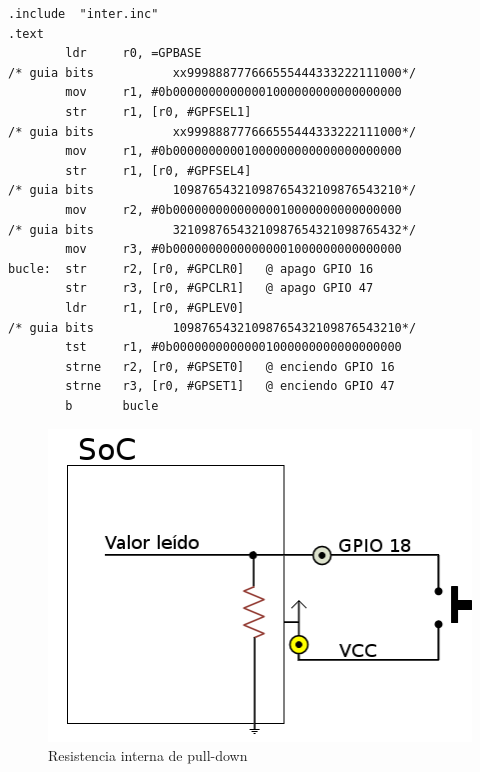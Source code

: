 \begin{lstlisting}[caption={apend3.s},label={lst:codigoApendice_3}]
        .include  "inter.inc"
.text
        ldr     r0, =GPBASE
/* guia bits           xx999888777666555444333222111000*/
        mov     r1, #0b00000000000001000000000000000000
        str     r1, [r0, #GPFSEL1]
/* guia bits           xx999888777666555444333222111000*/
        mov     r1, #0b00000000001000000000000000000000
        str     r1, [r0, #GPFSEL4]
/* guia bits           10987654321098765432109876543210*/
        mov     r2, #0b00000000000000010000000000000000
/* guia bits           32109876543210987654321098765432*/
        mov     r3, #0b00000000000000001000000000000000
bucle:  str     r2, [r0, #GPCLR0]   @ apago GPIO 16
        str     r3, [r0, #GPCLR1]   @ apago GPIO 47
        ldr     r1, [r0, #GPLEV0]
/* guia bits           10987654321098765432109876543210*/
        tst     r1, #0b00000000000001000000000000000000
        strne   r2, [r0, #GPSET0]   @ enciendo GPIO 16
        strne   r3, [r0, #GPSET1]   @ enciendo GPIO 47
        b       bucle
\end{lstlisting}

\begin{figure}[h]
  \centering
    \includegraphics[width=13cm]{graphs/pulldown.png}
  \caption{Resistencia interna de pull-down}
  \label{fig:pulldown}
\end{figure}

\chapterend
